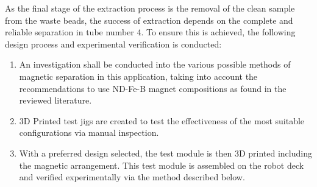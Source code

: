 As the final stage of the extraction process is the removal of the clean sample from the waste beads, the success of extraction depends on the complete and reliable separation in tube number 4. To ensure this is achieved, the following design process and experimental verification is conducted:
\begin{enumerate}
	\item An investigation shall be conducted into the various possible methods of magnetic separation in this application, taking into account the recommendations to use ND-Fe-B magnet compositions as found in the reviewed literature.
	\item 3D Printed test jigs are created to test the effectiveness of the most suitable configurations via manual inspection.
	\item With a preferred design selected, the test module is then 3D printed including the magnetic arrangement. This test module is assembled on the robot deck and verified experimentally via the method described below.
\end{enumerate}
